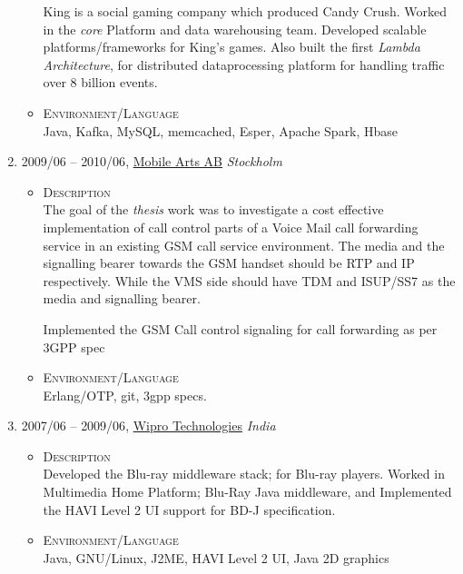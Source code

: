 \documentclass[a4paper,10pt]{article}
\begin{document}
\begin{enumerate}
\begin{itemize}
      King is a social gaming company which produced Candy Crush. Worked in the \emph{core} Platform and data warehousing team. Developed scalable platforms/frameworks for King's games.
      Also built the first \emph {Lambda Architecture}, for distributed dataprocessing platform for handling traffic over 8 billion events.

     \item \textsc {Environment/Language} \\
       Java, Kafka, MySQL, memcached, Esper, Apache Spark, Hbase

   \end{itemize}
  
\item \textsc{2009/06} – \textsc{2010/06}, \href{www.mobilearts.com}{Mobile Arts AB} \emph {Stockholm} \\
  \begin{itemize}
    \item \textsc{Description} \\
  
  The goal of the \emph{thesis} work was to investigate a cost effective implementation of call control parts of a Voice Mail call forwarding service in an existing GSM call service environment. The media and the signalling bearer towards the GSM handset should be RTP and IP respectively. While the VMS side should have TDM and ISUP/SS7 as the media and signalling bearer.

  Implemented the GSM Call control signaling for call forwarding as per 3GPP spec

  \item \textsc{Environment/Language} \\
  Erlang/OTP, git, 3gpp specs.

   \end{itemize}

\item \textsc{2007/06} – \textsc{2009/06}, \href{www.wipro.com}{Wipro Technologies} \emph {India} \\

  \begin{itemize}
    \item \textsc{Description} \\
      Developed the Blu-ray middleware stack; for Blu-ray players. Worked in Multimedia Home Platform; Blu-Ray Java middleware, and Implemented the HAVI Level 2 UI support for BD-J specification.

    \item \textsc{Environment/Language} \\  
      Java, GNU/Linux, J2ME, HAVI Level 2 UI, Java 2D graphics


\end{itemize}
\end{enumerate}
\end{document}
